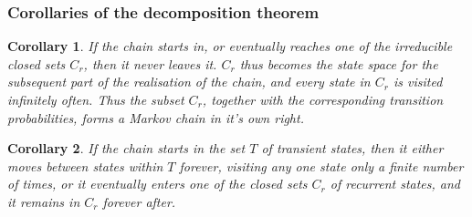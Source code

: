 \documentclass{article}
\newtheorem{corollary}{Corollary}
\begin{document}
\subsubsection{Corollaries of the decomposition theorem}
\begin{corollary}
    If the chain starts in, or eventually reaches one of the irreducible closed sets $C_r$, then it never leaves it. $C_r$ thus becomes the state space for the subsequent part of the realisation of the chain, and every state in $C_r$ is visited infinitely often. Thus the subset $C_r$, together with the corresponding transition probabilities, forms a Markov chain in it's own right.
\end{corollary}
\begin{corollary}
    If the chain starts in the set $T$ of transient states, then it either moves between states within $T$ forever, visiting any one state only a finite number of times, or it eventually enters one of the closed sets $C_r$ of recurrent states, and it remains in $C_r$ forever after.
\end{corollary}
\end{document}
